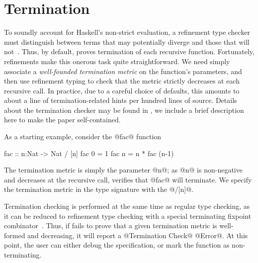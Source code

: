 \section{Termination}\label{sec:termination}

To soundly account for Haskell's non-strict evaluation, a refinement
type checker must distinguish between terms that may potentially 
diverge and those that will not~\cite{LiquidICFP14}.
%
Thus, by default, \toolname proves termination of each recursive function.
Fortunately, refinements make this onerous task quite straightforward. 
We need simply associate a \emph{well-founded termination metric} %
on the function's parameters, and then use refinement typing to check 
that the metric strictly decreases at each recursive call. In practice,
due to a careful choice of defaults, this amounts to about a line 
of termination-related hints per hundred lines of source. 
Details about the termination checker may be found in \cite{LiquidICFP14}, 
we include a brief description here to make the paper self-contained.

As a starting example, consider the @fac@ function
%
\begin{code}
  fac :: n:Nat -> Nat / [n]
  fac 0 = 1 
  fac n = n * fac (n-1)
\end{code}
%
The termination metric is simply the parameter @n@; 
as @n@ is non-negative and decreases at the recursive 
call, \toolname verifies that @fac@ will terminate.
%
We specify the termination metric in the type signature 
with the @/[n]@.

Termination checking is performed at the same 
time as regular type checking, as it can be 
reduced to refinement type checking with a 
special terminating fixpoint combinator~\cite{LiquidICFP14}.
Thus, if \toolname fails to prove that a given 
termination metric is well-formed and decreasing, 
it will report a @Termination Check@ @Error@. 
At this point, the user can either debug 
the specification, or mark the function 
as non-terminating.


